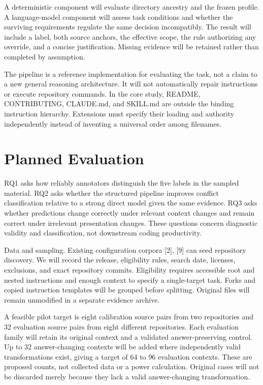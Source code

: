 \documentclass[10pt,conference]{IEEEtran}
\begin{document}
A deterministic component will evaluate directory ancestry and the frozen profile. A language-model component will assess task conditions and whether the surviving requirements regulate the same decision incompatibly. The result will include a label, both source anchors, the effective scope, the rule authorizing any override, and a concise justification. Missing evidence will be retained rather than completed by assumption.


The pipeline is a reference implementation for evaluating the task, not a claim to a new general reasoning architecture. It will not automatically repair instructions or execute repository commands. In the core study, README, CONTRIBUTING, CLAUDE.md, and SKILL.md are outside the binding instruction hierarchy. Extensions must specify their loading and authority independently instead of inventing a universal order among filenames.


\section{Planned Evaluation}

RQ1 asks how reliably annotators distinguish the five labels in the sampled material. RQ2 asks whether the structured pipeline improves conflict classification relative to a strong direct model given the same evidence. RQ3 asks whether predictions change correctly under relevant context changes and remain correct under irrelevant presentation changes. These questions concern diagnostic validity and classification, not downstream coding productivity.


Data and sampling. Existing configuration corpora [2], [9] can seed repository discovery. We will record the release, eligibility rules, search date, licenses, exclusions, and exact repository commits. Eligibility requires accessible root and nested instructions and enough context to specify a single-target task. Forks and copied instruction templates will be grouped before splitting. Original files will remain unmodified in a separate evidence archive.


A feasible pilot target is eight calibration source pairs from two repositories and 32 evaluation source pairs from eight different repositories. Each evaluation family will retain its original context and a validated answer-preserving control. Up to 32 answer-changing contexts will be added where independently valid transformations exist, giving a target of 64 to 96 evaluation contexts. These are proposed counts, not collected data or a power calculation. Original cases will not be discarded merely because they lack a valid answer-changing transformation.
\end{document}
